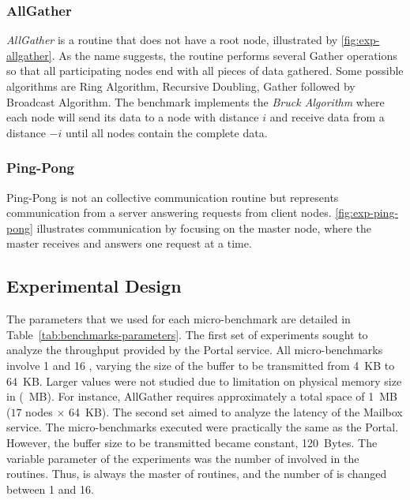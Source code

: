 			\subsubsection{AllGather}

				\textit{AllGather} is a routine that does not have a root node,
				illustrated by \autoref{fig:exp-allgather}. As the name suggests,
				the routine performs several Gather operations so that all
				participating nodes end with all pieces of data gathered. Some
				possible algorithms are Ring Algorithm, Recursive Doubling, Gather
				followed by Broadcast Algorithm. The benchmark implements the
				\textit{Bruck Algorithm} where each node will send its data to a
				node with distance $i$ and receive data from a distance $-i$ until
				all nodes contain the complete data.

			\subsubsection{Ping-Pong}

				Ping-Pong is not an \mpi collective communication routine but
				represents communication from a server answering requests from
				client nodes. \autoref{fig:exp-ping-pong} illustrates
				communication by focusing on the master node, where the master
				receives and answers one request at a time.

		\subsection{Experimental Design}
		\label{subsec:experimental-design}

			The parameters that we used for each micro-benchmark are detailed
			in Table~\ref{tab:benchmarks-parameters}.
			The first set of experiments sought to analyze the throughput
			provided by the Portal service. All micro-benchmarks involve 1
			\iocluster and 16 \cclusters, varying the size of the buffer to
			be transmitted from 4~KB to 64~KB. Larger values were not studied
			due to limitation on physical memory size in \cclusters (~MB).
			For instance, AllGather requires approximately a total space of
			1~MB ($17$ nodes $\times$ 64~KB).
			The second set aimed to analyze the latency of the Mailbox
			service. The micro-benchmarks executed were practically the same
			as the Portal. However, the buffer size to be transmitted became
			constant, 120~Bytes. The variable parameter of the experiments was
			the number of \cclusters involved in the routines.
			Thus, \iocluster is always the master of routines, and the number
			of \ccluster is changed between 1 and 16.

